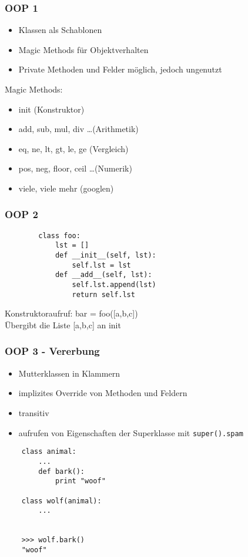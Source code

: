 \documentclass{beamer}
\begin{document}

\begin{frame}
	\frametitle{OOP 1}
	\begin{itemize}
		\item Klassen als Schablonen
		\item Magic Methods für Objektverhalten
		\item Private Methoden und Felder möglich, jedoch ungenutzt
	\end{itemize}
	\pause
	Magic Methods:
	\begin{itemize}
		\item init (Konstruktor)
		\item add, sub, mul, div \dots (Arithmetik)
		\item eq, ne, lt, gt, le, ge (Vergleich)
		\item pos, neg, floor, ceil \dots (Numerik)
		\item viele, viele mehr (googlen)
	\end{itemize}
\end{frame}

\begin{frame}[fragile]
	\frametitle{OOP 2}
	\begin{lstlisting}
		class foo:
			lst = []
		    def __init__(self, lst):
		        self.lst = lst
		    def __add__(self, lst):
		        self.lst.append(lst)
		        return self.lst
	\end{lstlisting}
	Konstruktoraufruf: bar = foo([a,b,c])\\
	Übergibt die Liste [a,b,c] an init
\end{frame}

\begin{frame}[fragile]
	\frametitle{OOP 3 - Vererbung}
	\begin{itemize}
		\item Mutterklassen in Klammern
		\item implizites Override von Methoden und Feldern
		\item transitiv
		\item aufrufen von Eigenschaften der Superklasse mit \texttt{super().spam}
	\end{itemize}
	\pause
	\begin{lstlisting}
	class animal:
	    ...
	    def bark():
	        print "woof"
	    	
	class wolf(animal):
	    ...
	    
	    
	>>> wolf.bark()
	"woof"
	\end{lstlisting}
\end{frame}
\end{document}
